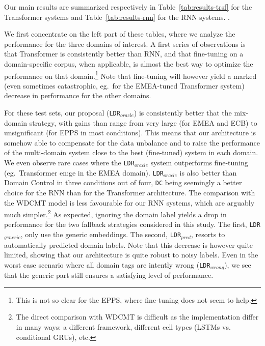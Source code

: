 \documentclass[11pt,a4paper]{article}
\newcommand{\fyTodo}[1]{\Todo[FY:]{\textcolor{orange}{#1}}}
\newcommand{\fyDone}[1]{\done[FY]\Todo[FY:]{\textcolor{orange}{#1}}}
\begin{document}
Our main results are summarized respectively in Table~\ref{tab:results-trsf} for the Transformer systems and Table~\ref{tab:results-rnn} for the RNN systems. \fyTodo{Footnote for missing numbers}.

We first concentrate on the left part of these tables, where we analyze the performance for the three domains of interest. A first series of observations is that Transformer is consistently better than RNN, and that fine-tuning on a domain-specific corpus, when applicable, is almost the best way to optimize the performance on that domain.\footnote{This is not so clear for the EPPS, where fine-tuning does not seem to help.}  Note that fine-tuning will however yield a marked (even sometimes catastrophic, eg.\ for the EMEA-tuned Transformer system) decrease in performance for the other domains. 

For these test sets, our proposal (\texttt{LDR}$_{oracle}$) is consistently better that the mix-domain strategy, with gains than range from very large (for EMEA and ECB) to unsignificant (for EPPS in most conditions). This means that our architecture is somehow able to compensate for the data unbalance and to raise the performance of the multi-domain system close to the best (fine-tuned) system in each domain. We even observe rare cases where the \texttt{LDR}$_{oracle}$ system outperforms fine-tuning (eg.\ Transformer en:ge in the EMEA domain). \texttt{LDR}$_{oracle}$ is also better than Domain Control in three conditions out of four, \texttt{DC} being seemingly a better choice for the RNN than for the Transformer architecture. The comparison with the WDCMT model is less favourable for our RNN systems, which are arguably much simpler.\footnote{The direct comparison with WDCMT is difficult as the implementation differ in many ways: a different framework, different cell types (LSTMs vs. conditional GRUs), etc.} \fyDone{More on this.}
As expected, ignoring the domain label yields a drop in performance for the two fallback strategies considered in this study. The first, \texttt{LDR}$_{generic}$, only use the generic embeddings. The second, \texttt{LDR}$_{pred}$\fyTodo{Fix this}, resorts to automatically predicted domain labels.\fyTodo{Explain how} Note that this decrease is however quite limited\fyTodo{How much on average ?}, showing that our architecture is quite robust to noisy labels. Even in the worst case scenario where all domain tags are intently wrong (\texttt{LDR}$_{wrong}$), we see that the generic part still ensures a satisfying level of performance.\fyTodo{Comment V2 from Minh}
\end{document}
